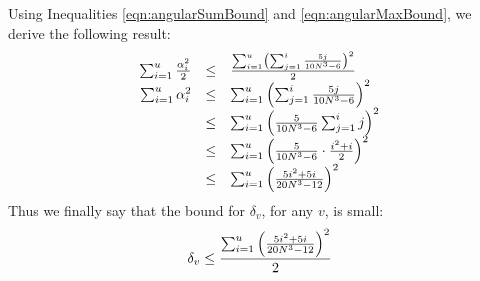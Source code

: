 Using Inequalities \ref{eqn:angularSumBound} and \ref{eqn:angularMaxBound}, we derive the following result:
$$
\begin{array}{rcl}
\sum_{i=1}^u \frac{\alpha_i^2}{2} &\leq& \frac{\sum_{i=1}^u \left( \sum_{j=1}^i \frac{5j}{10N^3-6} \right)^2}{2}\\
\sum_{i=1}^u \alpha_i^2 &\leq& \sum_{i=1}^u \left( \sum_{j=1}^i \frac{5j}{10N^3-6} \right)^2\\
&\leq&\sum_{i=1}^u  \left(  \frac{5}{10N^3-6} \sum_{j=1}^i j \right)^2\\
&\leq&\sum_{i=1}^u  \left(  \frac{5}{10N^3-6}\cdot \frac{i^2+i}{2} \right)^2\\
&\leq&\sum_{i=1}^u \left( \frac{5i^2+5i}{20N^3-12} \right)^2\\
\end{array}$$
Thus we finally say that the bound for $\delta_v$, for any $v$, is small:
\begin{equation}\label{eqn:verticalBound}
\delta_v \leq \frac{\sum_{i=1}^u \left( \frac{5i^2+5i}{20N^3-12} \right)^2}{2}
\end{equation}



